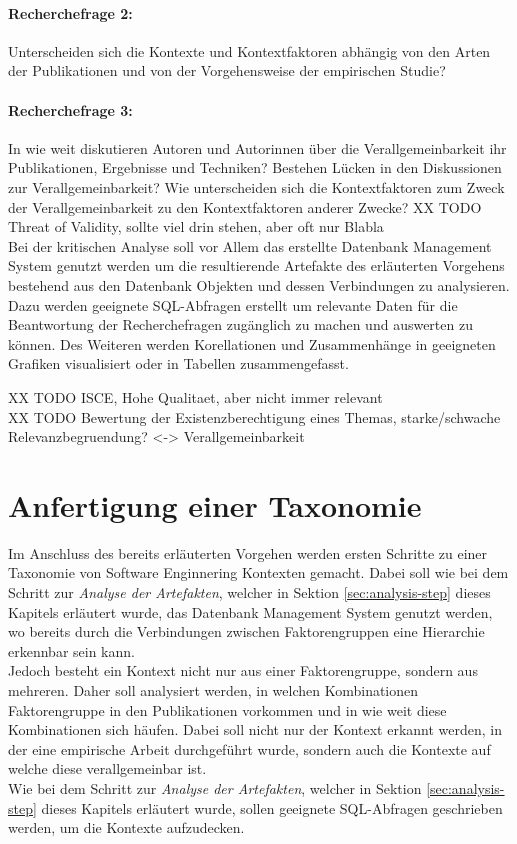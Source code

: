 \paragraph{Recherchefrage 2:} Unterscheiden sich die Kontexte und Kontextfaktoren abhängig von den Arten der Publikationen und von der Vorgehensweise der empirischen Studie?

\paragraph{Recherchefrage 3:} In wie weit diskutieren Autoren und Autorinnen über die Verallgemeinbarkeit ihr Publikationen, Ergebnisse und Techniken? Bestehen Lücken in den Diskussionen zur Verallgemeinbarkeit? Wie unterscheiden sich die Kontextfaktoren zum Zweck der Verallgemeinbarkeit zu den Kontextfaktoren anderer Zwecke? 
XX TODO Threat of Validity, sollte viel drin stehen, aber oft nur Blabla \\

Bei der kritischen Analyse soll vor Allem das erstellte Datenbank Management System genutzt werden um die resultierende Artefakte des erläuterten Vorgehens bestehend aus den Datenbank Objekten und dessen Verbindungen zu analysieren. Dazu werden geeignete SQL-Abfragen erstellt um relevante Daten für die Beantwortung der Recherchefragen zugänglich zu machen und auswerten zu können. Des Weiteren werden Korellationen und Zusammenhänge in geeigneten Grafiken visualisiert oder in Tabellen zusammengefasst.

XX TODO ISCE, Hohe Qualitaet, aber nicht immer relevant \\
XX TODO Bewertung der Existenzberechtigung eines Themas, starke/schwache Relevanzbegruendung? <-> Verallgemeinbarkeit \\

\section{Anfertigung einer Taxonomie}
Im Anschluss des bereits erläuterten Vorgehen werden ersten Schritte zu einer Taxonomie von Software Enginnering Kontexten gemacht. Dabei soll wie bei dem Schritt zur \textit{Analyse der Artefakten}, welcher in Sektion \ref{sec:analysis-step} dieses Kapitels erläutert wurde, das Datenbank Management System genutzt werden, wo bereits durch die Verbindungen zwischen Faktorengruppen eine Hierarchie erkennbar sein kann. \\

Jedoch besteht ein Kontext nicht nur aus einer Faktorengruppe, sondern aus mehreren. Daher soll analysiert werden, in welchen Kombinationen Faktorengruppe in den Publikationen vorkommen und in wie weit diese Kombinationen sich häufen. Dabei soll nicht nur der Kontext erkannt werden, in der eine empirische Arbeit durchgeführt wurde, sondern auch die Kontexte auf welche diese verallgemeinbar ist. \\
Wie bei dem Schritt zur \textit{Analyse der Artefakten}, welcher in Sektion \ref{sec:analysis-step} dieses Kapitels erläutert wurde, sollen geeignete SQL-Abfragen geschrieben werden, um die Kontexte aufzudecken.

